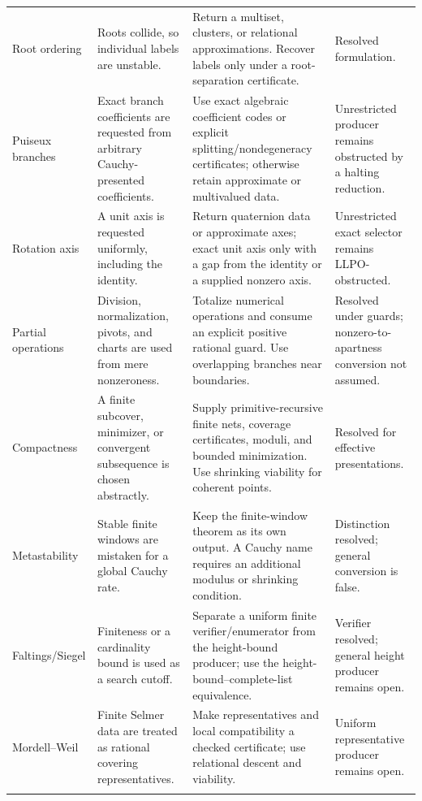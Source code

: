 \begin{longtable}{@{}p{}p{}p{}p{}@{}}
Root ordering & Roots collide, so individual labels are unstable. & Return a
multiset, clusters, or relational approximations.  Recover labels only under a
root-separation certificate. & Resolved formulation.\\
\addlinespace

Puiseux branches & Exact branch coefficients are requested from arbitrary
Cauchy-presented coefficients. & Use exact algebraic coefficient codes or
explicit splitting/nondegeneracy certificates; otherwise retain approximate
or multivalued data. & Unrestricted producer remains obstructed by a halting
reduction.\\
\addlinespace

Rotation axis & A unit axis is requested uniformly, including the identity. &
Return quaternion data or approximate axes; exact unit axis only with a gap
from the identity or a supplied nonzero axis. & Unrestricted exact selector
remains LLPO-obstructed.\\
\addlinespace

Partial operations & Division, normalization, pivots, and charts are used from
mere nonzeroness. & Totalize numerical operations and consume an explicit
positive rational guard.  Use overlapping branches near boundaries. &
Resolved under guards; nonzero-to-apartness conversion not assumed.\\
\addlinespace

Compactness & A finite subcover, minimizer, or convergent subsequence is chosen
abstractly. & Supply primitive-recursive finite nets, coverage certificates,
moduli, and bounded minimization.  Use shrinking viability for coherent points.
& Resolved for effective presentations.\\
\addlinespace

Metastability & Stable finite windows are mistaken for a global Cauchy rate. &
Keep the finite-window theorem as its own output.  A Cauchy name requires an
additional modulus or shrinking condition. & Distinction resolved; general
conversion is false.\\
\addlinespace

Faltings/Siegel & Finiteness or a cardinality bound is used as a search cutoff.
& Separate a uniform finite verifier/enumerator from the height-bound producer;
use the height-bound--complete-list equivalence. & Verifier resolved; general
height producer remains open.\\
\addlinespace

Mordell--Weil & Finite Selmer data are treated as rational covering
representatives. & Make representatives and local compatibility a checked
certificate; use relational descent and viability. & Uniform representative
producer remains open.\\
\addlinespace


\end{longtable}

